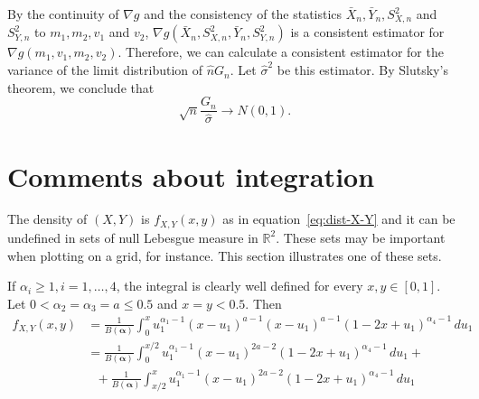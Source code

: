 \documentclass[a4paper, notitlepage, 10pt]{article}
\newcommand{\R}{\mathbb{R}}
\theoremstyle{definition}
\begin{document}
By the continuity of $\nabla g$ and the consistency of the statistics $\bar{X}_n, \bar{Y}_n, S_{X,n}^2$ and $S_{Y,n}^2$ to $m_1, m_2, v_1$ and $v_2$, $\nabla g(\bar{X}_n, S_{X,n}^2, \bar{Y}_n, S_{Y,n}^2)$ is a consistent estimator for $\nabla g(m_1, v_1, m_2, v_2)$.
Therefore, we can calculate a consistent estimator for the variance of the limit distribution of $\hat{n} G_n$.
Let $\hat{\sigma}^2$ be this estimator. 
By Slutsky's theorem, we conclude that 
\[
\sqrt{n} \frac{G_n}{\hat\sigma} \to N(0,1).
\]

\section{Comments about integration}\label{sec:integration_comment}

The density of $(X,Y)$ is $f_{X,Y}(x,y)$ as in equation~\eqref{eq:dist-X-Y} and it can be undefined in sets of null Lebesgue measure in $\R^2$. 
These sets may be important when plotting on a grid, for instance.
This section illustrates one of these sets.

If $\alpha_i \ge 1, i = 1, \dots, 4$, the integral is clearly well defined for every $x,y \in [0,1]$. Let $0 < \alpha_2 = \alpha_3 = a \le 0.5$ and $x = y < 0.5$. 
Then
\begin{equation*}
  \begin{split}
    f_{X,Y}(x,y) &= \frac{1}{B(\boldsymbol{\alpha})}\int_{0}^x u_1^{\alpha_1-1}{(x-u_1)}^{a-1}{(x-u_1)}^{a-1}{(1-2x+u_1)}^{\alpha_4-1} \, du_1 \\
    &= \frac{1}{B(\boldsymbol{\alpha})}\int_{0}^{x/2} u_1^{\alpha_1-1}{(x-u_1)}^{2a-2}{(1-2x+u_1)}^{\alpha_4-1} \, du_1 + \\
    &~~~+ \frac{1}{B(\boldsymbol{\alpha})}\int_{x/2}^x u_1^{\alpha_1-1}{(x-u_1)}^{2a-2}{(1-2x+u_1)}^{\alpha_4-1} \, du_1
  \end{split}
\end{equation*}
\end{document}

